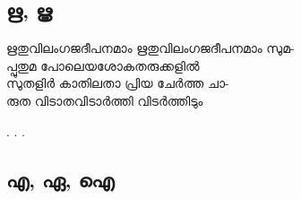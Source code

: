 \subsection{ഋ, ൠ}

\begin{enumerate}

\begin{slokam}{\VDv}{\Kund}{ഋതുവിലംഗജദീപനമാം}
ഋതുവിലംഗജദീപനമാം സുമ-\\
പ്പുതുമ പോലെയശോകതരുക്കളില്‍\\
സുതളിര്‍ കാതിലതാ പ്രിയ ചേര്‍ത്ത ചാ-\\
രുത വിടാതവിടാര്‍ത്തി വിടര്‍ത്തിടും
\end{slokam}


. 
. .

\end{enumerate}

\subsection{എ, ഏ, ഐ}

